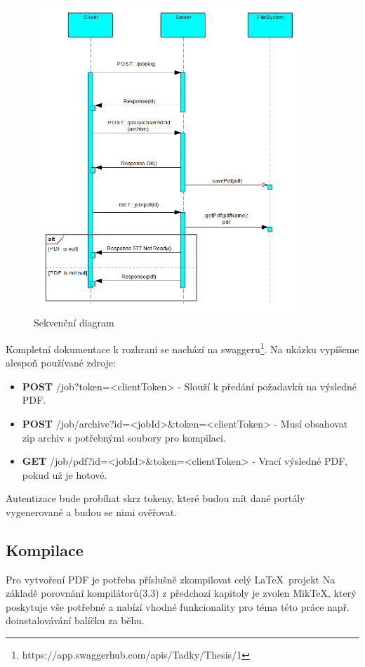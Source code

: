 \begin{figure}[H]
	\includegraphics[width=0.9\textwidth]{diagram}
	\centering
	\caption{Sekvenční diagram}
	\label{fig:seq}
\end{figure}

Kompletní dokumentace k rozhraní se nachází na swaggeru\footnote{https://app.swaggerhub.com/apis/Tadky/Thesis/1}. Na ukázku vypíšeme alespoň používané zdroje:
\begin{itemize}
	\item \textbf{POST} {\ttfamily /job?token=<clientToken>} - Slouží k předání požadavků na výsledné PDF.
	\item \textbf{POST} {\ttfamily /job/archive?id=<jobId>\&token=<clientToken>} - Musí obsahovat zip archiv s potřebnými soubory pro kompilaci.
	\item \textbf{GET} {\ttfamily /job/pdf?id=<jobId>\&token=<clientToken>} - Vrací výsledné PDF, pokud už je hotové.
\end{itemize}

Autentizace bude probíhat skrz tokeny, které budou mít dané portály vygenerované a budou se nimi ověřovat.

\subsection{Kompilace}
Pro vytvoření PDF je potřeba příslušně zkompilovat celý \LaTeX\ projekt 
Na základě porovnání kompilátorů(3.3) z předchozí kapitoly je zvolen MikTeX, který poskytuje vše potřebné a nabízí vhodné funkcionality pro téma této práce např. doinstalovávání balíčku za běhu. 

